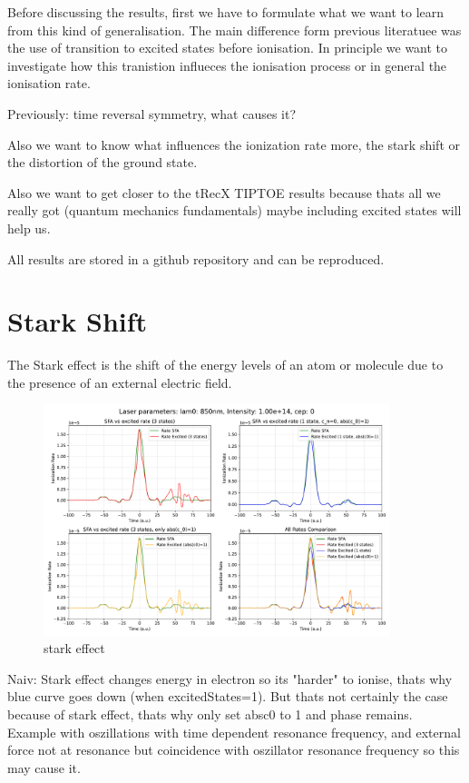 Before discussing the results, first we have to formulate what we want to learn from this kind of generalisation. 
The main difference form previous literatuee was the use of transition to excited states before ionisation. 
In principle we want to investigate how this tranistion influeces the ionisation process or in general the ionisation rate.

Previously: time reversal symmetry, what causes it? 

Also we want to know what influences the ionization rate more, the stark shift or the distortion of the ground state.

Also we want to get closer to the tRecX TIPTOE results because thats all we really got (quantum mechanics fundamentals) maybe including excited states will help us.

All results are stored in a github repository and can be reproduced.

\section{Stark Shift}
The Stark effect is the shift of the energy levels of an atom or molecule due to the presence of an external electric field.

\begin{figure}[H]
    \centering
    \includegraphics[width=0.9\textwidth]{figures/rate4_850_1.00e+14_onlystark.pdf}
    \caption{stark effect}
    \label{fig:starkeffect}
\end{figure}

Naiv: Stark effect changes energy in electron so its "harder" to ionise, thats why blue curve goes down (when excitedStates=1). 
But thats not certainly the case because of stark effect, thats why only set absc0 to 1 and phase remains. 
Example with oszillations with time dependent resonance frequency, and external force not at resonance but coincidence with oszillator resonance frequency so this may cause it.


